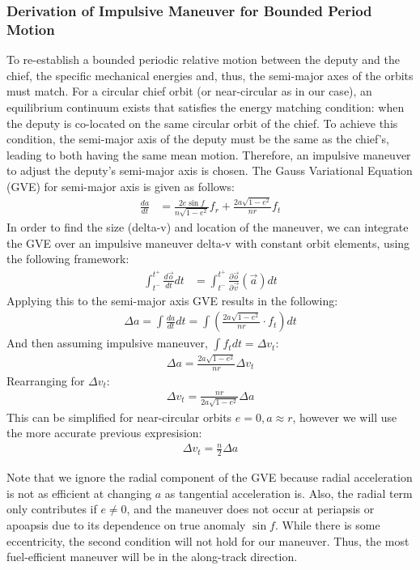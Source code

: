 \subsubsection{Derivation of Impulsive Maneuver for Bounded Period Motion}
To re-establish a bounded periodic relative motion between the deputy and the chief, the specific mechanical energies and, thus, the semi-major axes of the orbits must match. For a circular chief orbit (or near-circular as in our case), an equilibrium continuum exists that satisfies the energy matching condition: when the deputy is co-located on the same circular orbit of the chief. To achieve this condition, the semi-major axis of the deputy must be the same as the chief's, leading to both having the same mean motion. Therefore, an impulsive maneuver to adjust the deputy's semi-major axis is chosen. The Gauss Variational Equation (GVE) for semi-major axis is given as follows:
\begin{align}
\frac{da}{dt} &= \frac{2e \sin f}{n \sqrt{1 - e^2}} f_r + \frac{2a \sqrt{1 - e^2}}{n r} f_t
\end{align}
In order to find the size (delta-v) and location of the maneuver, we can integrate the GVE over an impulsive maneuver delta-v with constant orbit elements, using the following framework:
\begin{align}
\int_{t^-}^{t^+} \frac{d\vec{o}}{dt} dt &= \int_{t^-}^{t^+} \frac{\partial \vec{o}}{\partial \vec{v}} \left( \vec{a} \right) dt
\end{align}
Applying this to the semi-major axis GVE results in the following:
\begin{align}
\Delta a = \int \frac{da}{dt} dt = \int \left( \frac{2a \sqrt{1 - e^2}}{n r} \cdot f_t \right) dt
\end{align}
And then assuming impulsive maneuver, \( \int f_t dt = \Delta v_t \):
\begin{align}
\Delta a = \frac{2a \sqrt{1 - e^2}}{n r} \Delta v_t
\end{align}
Rearranging for $\Delta v_t$:
\begin{align}
\Delta v_t = \frac{n r}{2a \sqrt{1 - e^2}} \Delta a
\end{align}
This can be simplified for near-circular orbits \( e = 0, a \approx r \), however we will use the more accurate previous expresision:
\begin{align}
\Delta v_t = \frac{n}{2} \Delta a
\end{align}

Note that we ignore the radial component of the GVE because radial acceleration is not as efficient at changing \( a \) as tangential acceleration is. Also, the radial term only contributes if \( e \neq 0 \), and the maneuver does not occur at periapsis or apoapsis due to its dependence on true anomaly \(\sin f\). While there is some eccentricity, the second condition will not hold for our maneuver. Thus, the most fuel-efficient maneuver will be in the along-track direction.

